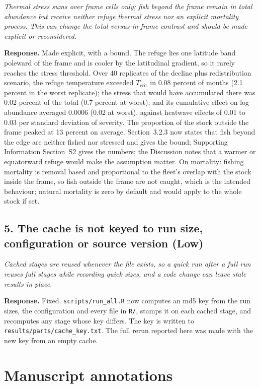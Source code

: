 \documentclass[11pt,a4paper]{article}
\newcommand{\rev}[1]{\par\medskip\noindent\textit{\color{black!60}#1}\par\smallskip}
\newcommand{\resp}{\noindent\textbf{Response.} }
\begin{document}
\rev{Thermal stress sums over frame cells only; fish beyond the frame remain in total abundance but receive neither refuge thermal stress nor an explicit mortality process. This can change the total-versus-in-frame contrast and should be made explicit or reconsidered.}

\resp Made explicit, with a bound. The refuge lies one latitude band poleward of the frame and is cooler by the latitudinal gradient, so it rarely reaches the stress threshold. Over 40 replicates of the decline plus redistribution scenario, the refuge temperature exceeded $T_{\mathrm{crit}}$ in 0.08 percent of months (2.1 percent in the worst replicate); the stress that would have accumulated there was 0.02 percent of the total (0.7 percent at worst); and its cumulative effect on log abundance averaged 0.0006 (0.02 at worst), against heatwave effects of 0.01 to 0.03 per standard deviation of severity. The proportion of the stock outside the frame peaked at 13 percent on average. Section~3.2.3 now states that fish beyond the edge are neither fished nor stressed and gives the bound; Supporting Information Section~S2 gives the numbers; the Discussion notes that a warmer or equatorward refuge would make the assumption matter. On mortality: fishing mortality is removal based and proportional to the fleet's overlap with the stock inside the frame, so fish outside the frame are not caught, which is the intended behaviour; natural mortality is zero by default and would apply to the whole stock if set.

\subsection*{5. The cache is not keyed to run size, configuration or source version (Low)}

\rev{Cached stages are reused whenever the file exists, so a quick run after a full run reuses full stages while recording quick sizes, and a code change can leave stale results in place.}

\resp Fixed. \texttt{scripts/run\_all.R} now computes an md5 key from the run sizes, the configuration and every file in \texttt{R/}, stamps it on each cached stage, and recomputes any stage whose key differs. The key is written to \texttt{results/parts/cache\_key.txt}. The full rerun reported here was made with the new key from an empty cache.

\section*{Manuscript annotations}
\end{document}
